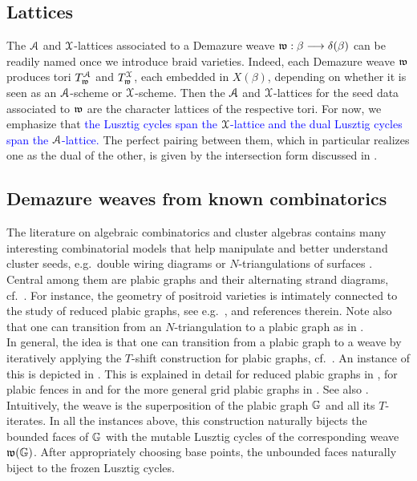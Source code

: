 \subsection{Lattices}\label{ssec:lattices_seed_data} The $\mathcal{A}$ and $\mathcal{X}$-lattices associated to a Demazure weave $\mathfrak{w}:\beta\longrightarrow\delta(\beta)$ can be readily named once we introduce braid varieties. Indeed, each Demazure weave $\mathfrak{w}$ produces tori $T_{\mathfrak{w}}^{\mathcal{A}}$ and $T_{\mathfrak{w}}^{\mathcal{X}}$, each embedded in $X(\beta)$, depending on whether it is seen as an $\mathcal{A}$-scheme or $\mathcal{X}$-scheme. Then the $\mathcal{A}$ and $\mathcal{X}$-lattices for the seed data associated to $\mathfrak{w}$ are the character lattices of the respective tori. For now, we emphasize that \textcolor{blue}{the Lusztig cycles span the $\mathcal{X}$-lattice and the dual Lusztig cycles span the $\mathcal{A}$-lattice.} The perfect pairing between them, which in particular realizes one as the dual of the other, is given by the intersection form discussed in .


\subsection{Demazure weaves from known combinatorics}\label{ssec:Demazure_weaves_from_combinatorics} The literature on algebraic combinatorics and cluster algebras contains many interesting combinatorial models that help manipulate and better understand cluster seeds, e.g.~double wiring diagrams \cite{FZ2000Tests} or $N$-triangulations of surfaces \cite{FG2006}. Central among them are plabic graphs and their alternating strand diagrams, cf.~\cite[Section 11]{Pos}. For instance, the geometry of positroid varieties is intimately connected to the study of reduced plabic graphs, see e.g.~\cite{GL2023,Scott06,SSBW2019}, \cite[Chapter 7]{FWZ16} and references therein. Note also that one can transition from an $N$-triangulation to a plabic graph as in \cite[Section 1.1]{Gon17}.\\

In general, the idea is that one can transition from a plabic graph to a weave by iteratively applying the $T$-shift construction for plabic graphs, cf.~\cite[Section 8.2]{PSBW}. An instance of this is depicted in . This is explained in detail for reduced plabic graphs in \cite[Section 3]{casals2023demazureweavesreducedplabic}, for plabic fences in \cite[Section 3]{casals2022conjugate} and for the more general grid plabic graphs in \cite[Section 3]{CasalsWeng22}. See also \cite[Section 6.1]{casals2025comparingclusteralgebrasbraid}. Intuitively, the weave is the superposition of the plabic graph $\mathbb{G}$ and all its $T$-iterates. In all the instances above, this construction naturally bijects the bounded faces of $\mathbb{G}$ with the mutable Lusztig cycles of the corresponding weave $\mathfrak{w}(\mathbb{G})$. After appropriately choosing base points, the unbounded faces naturally biject to the frozen Lusztig cycles.

